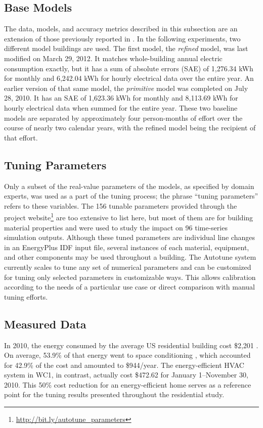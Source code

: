 \documentclass[preprint, review, 12pt]{elsarticle}
\begin{document}
\subsection{Base Models}
The data, models, and accuracy metrics described in this subsection are an extension of those previously reported in \cite{cit:garrett2013}. In the following experiments, two different model buildings are used. The first model, the \emph{refined} model, was last modified on March 29, 2012. It matches whole-building annual electric consumption exactly, but it has a sum of absolute errors (SAE) of 1,276.34 kWh for monthly and 6,242.04 kWh for hourly electrical data over the entire year. An earlier version of that same model, the \emph{primitive} model was completed on July 28, 2010. It has an SAE of 1,623.36 kWh for monthly and 8,113.69 kWh for hourly electrical data when summed for the entire year. These two baseline models are separated by approximately four person-months of effort over the course of nearly two calendar years, with the refined model being the recipient of that effort.

\subsection{Tuning Parameters}
Only a subset of the real-value parameters of the models, as specified by domain experts, was used as a part of the tuning process; the phrase ``tuning parameters'' refers to these variables. The 156 tunable parameters provided through the project website\footnote{\url{http://bit.ly/autotune_parameters}} are too extensive to list here, but most of them are for building material properties and were used to study the impact on 96 time-series simulation outputs.
Although these tuned parameters are individual line changes in an EnergyPlus IDF input file, several instances of each material, equipment, and other components may be used throughout a building. The Autotune system currently scales to tune any set of numerical parameters and can be customized for tuning only selected parameters in customizable ways. This allows calibration according to the needs of a particular use case or direct comparison with manual tuning efforts.

\subsection{Measured Data}
In 2010, the energy consumed by the average US residential building cost \$2,201 \cite{cit:doe2012a}. On average, 53.9\% of that energy went to space conditioning \cite{cit:doe2012b}, which accounted for 42.9\% of the cost and amounted to \$944/year. The energy-efficient HVAC system in WC1, in contrast, actually cost \$472.62 for January 1--November 30, 2010. This 50\% cost reduction for an energy-efficient home serves as a reference point for the tuning results presented throughout the residential study.
\end{document}

